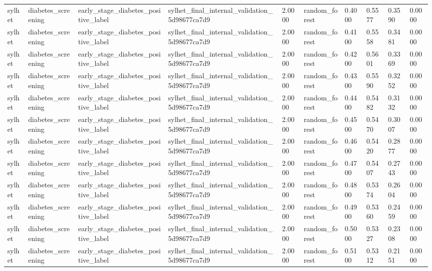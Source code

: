 \begin{tabular}{llllllllll}
sylhet & diabetes\_screening & early\_stage\_diabetes\_positive\_label & sylhet\_final\_internal\_validation\_5d98677ca7d9 & 2.0000 & random\_forest & 0.4000 & 0.5577 & 0.3590 & 0.0000 \\
sylhet & diabetes\_screening & early\_stage\_diabetes\_positive\_label & sylhet\_final\_internal\_validation\_5d98677ca7d9 & 2.0000 & random\_forest & 0.4100 & 0.5558 & 0.3481 & 0.0000 \\
sylhet & diabetes\_screening & early\_stage\_diabetes\_positive\_label & sylhet\_final\_internal\_validation\_5d98677ca7d9 & 2.0000 & random\_forest & 0.4200 & 0.5601 & 0.3369 & 0.0000 \\
sylhet & diabetes\_screening & early\_stage\_diabetes\_positive\_label & sylhet\_final\_internal\_validation\_5d98677ca7d9 & 2.0000 & random\_forest & 0.4300 & 0.5590 & 0.3252 & 0.0000 \\
sylhet & diabetes\_screening & early\_stage\_diabetes\_positive\_label & sylhet\_final\_internal\_validation\_5d98677ca7d9 & 2.0000 & random\_forest & 0.4400 & 0.5482 & 0.3132 & 0.0000 \\
sylhet & diabetes\_screening & early\_stage\_diabetes\_positive\_label & sylhet\_final\_internal\_validation\_5d98677ca7d9 & 2.0000 & random\_forest & 0.4500 & 0.5470 & 0.3007 & 0.0000 \\
sylhet & diabetes\_screening & early\_stage\_diabetes\_positive\_label & sylhet\_final\_internal\_validation\_5d98677ca7d9 & 2.0000 & random\_forest & 0.4600 & 0.5420 & 0.2877 & 0.0000 \\
sylhet & diabetes\_screening & early\_stage\_diabetes\_positive\_label & sylhet\_final\_internal\_validation\_5d98677ca7d9 & 2.0000 & random\_forest & 0.4700 & 0.5407 & 0.2743 & 0.0000 \\
sylhet & diabetes\_screening & early\_stage\_diabetes\_positive\_label & sylhet\_final\_internal\_validation\_5d98677ca7d9 & 2.0000 & random\_forest & 0.4800 & 0.5374 & 0.2604 & 0.0000 \\
sylhet & diabetes\_screening & early\_stage\_diabetes\_positive\_label & sylhet\_final\_internal\_validation\_5d98677ca7d9 & 2.0000 & random\_forest & 0.4900 & 0.5360 & 0.2459 & 0.0000 \\
sylhet & diabetes\_screening & early\_stage\_diabetes\_positive\_label & sylhet\_final\_internal\_validation\_5d98677ca7d9 & 2.0000 & random\_forest & 0.5000 & 0.5327 & 0.2308 & 0.0000 \\
sylhet & diabetes\_screening & early\_stage\_diabetes\_positive\_label & sylhet\_final\_internal\_validation\_5d98677ca7d9 & 2.0000 & random\_forest & 0.5100 & 0.5312 & 0.2151 & 0.0000 \\

\end{tabular}
